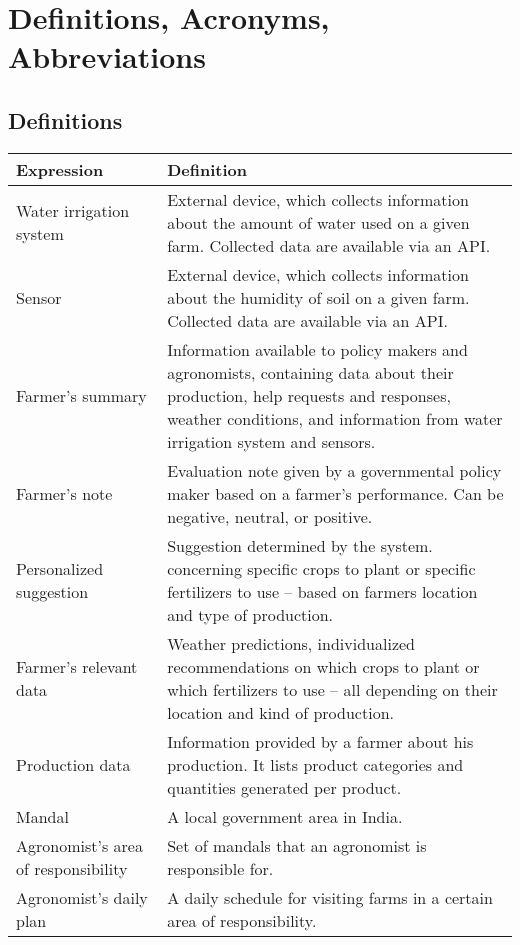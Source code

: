 \section{Definitions, Acronyms, Abbreviations}

\subsection{Definitions}

\begin{center}
	\begin{tabular}{@{}p{0.30\linewidth} p{0.70\linewidth}@{}}
		\toprule
		\textbf{Expression}     & \textbf{Definition}\\
		\midrule
		Water irrigation system & External device, which collects information about the amount of water used on a given farm. Collected data are available via an API. \\
        Sensor                  & External device, which collects information about the humidity of soil on a given farm. Collected data are available via an API.\\
        Farmer's summary        & Information available to policy makers and agronomists, containing data about their production, help requests and responses, weather conditions, and information from water irrigation system and sensors.\\
        Farmer's note           & Evaluation note given by a governmental policy maker based on a farmer's performance. Can be negative, neutral, or positive.\\
        Personalized suggestion & Suggestion determined by the system. concerning specific crops to plant or specific fertilizers to use – based on farmers location and type of production.\\
        Farmer's relevant data  & Weather predictions, individualized recommendations on which crops to plant or which fertilizers to use – all depending on their location and kind of production.\\
        Production data         & Information provided by a farmer about his production. It lists product categories and quantities generated per product.\\
        Mandal                  & A local government area in India.\\
        Agronomist's area of responsibility  & Set of mandals that an agronomist is responsible for.\\
        Agronomist's daily plan & A daily schedule for visiting farms in a certain area of responsibility.\\
	\end{tabular}
\end{center}

